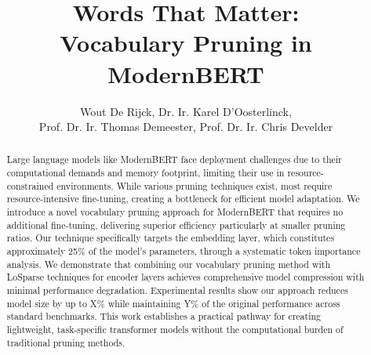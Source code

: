 \documentclass[twocolumn]{article}
\title{\huge \textbf{Words That Matter:\\ Vocabulary Pruning in ModernBERT}}
\author{Wout De Rijck, Dr. Ir. Karel D'Oosterlinck, \\ Prof. Dr. Ir. Thomas Demeester, Prof. Dr. Ir. Chris Develder}
\date{} %
\begin{document}
\maketitle







\begin{abstract}
Large language models like ModernBERT face deployment challenges due to their computational demands and memory footprint, limiting their use in resource-constrained environments. While various pruning techniques exist, most require resource-intensive fine-tuning, creating a bottleneck for efficient model adaptation. We introduce a novel vocabulary pruning approach for ModernBERT that requires no additional fine-tuning, delivering superior efficiency particularly at smaller pruning ratios. Our technique specifically targets the embedding layer, which constitutes approximately 25\% of the model's parameters, through a systematic token importance analysis. We demonstrate that combining our vocabulary pruning method with LoSparse techniques for encoder layers achieves comprehensive model compression with minimal performance degradation. Experimental results show our approach reduces model size by up to X\% while maintaining Y\% of the original performance across standard benchmarks. This work establishes a practical pathway for creating lightweight, task-specific transformer models without the computational burden of traditional pruning methods.
\end{abstract}

\end{document}
